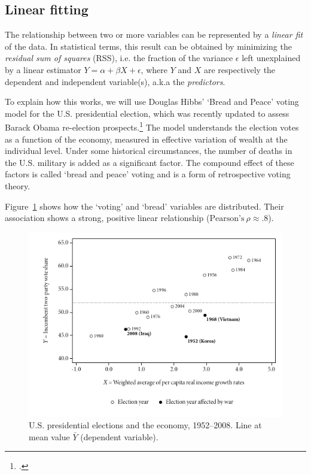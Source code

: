 	\subsection{Linear fitting}

  The relationship between two or more variables can be represented by a \emph{linear fit} of the data. In statistical terms, this result can be obtained by minimizing the \emph{residual sum of squares} (RSS), i.e. the fraction of the variance $\epsilon$ left unexplained by a linear estimator $Y = \alpha + \beta X + \epsilon$, where $Y$ and $X$ are respectively the dependent and independent variable(s), a.k.a the \emph{predictors}.

  To explain how this works, we will use Douglas Hibbs' `Bread and Peace' voting model for the U.S. presidential election, which was recently updated to assess Barack Obama re-election prospects.\footcite{Hibbs:2012a} The model understands the election votes as a function of the economy, measured in effective variation of wealth at the individual level. Under some historical circumstances, the number of deaths in the U.S. military is added as a significant factor. The compound effect of these factors is called `bread and peace' voting and is a form of retrospective voting theory.

  Figure~\ref{fig:hibbs_data} shows how the `voting' and `bread' variables are distributed. Their association shows a strong, positive linear relationship ($\text{Pearson's}~\rho \approx .8$).

  \begin{figure}[htp]
  	\includegraphics[width=.9\textwidth]{images/hibbs1.pdf}

  	\caption[U.S. presidential elections]{\label{fig:hibbs_data}
  	U.S. presidential elections and the economy, 1952--2008. %
  	Line at mean value $\bar Y$ (dependent variable). %
    \hibbs}
  \end{figure}%

